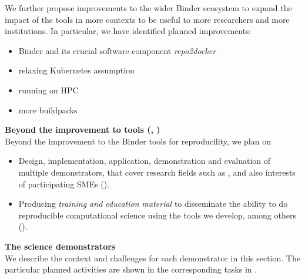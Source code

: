 We further propose improvements to the wider Binder ecosystem
to expand the impact of the tools in more contexts to be useful to more researchers
and more institutions.
In particular, we have identified planned improvements:

\begin{itemize}
  \item Binder and its crucial software component \emph{repo2docker}
  \item relaxing Kubernetes assumption
  \item running on HPC
  \item more buildpacks

\end{itemize}

\medskip\noindent\textbf{Beyond the improvement to \TheProject tools
  (, )}\\
Beyond the improvement to the Binder tools for reproducility, we plan on
\begin{itemize}
\item Design, implementation, application, demonstration and
  evaluation of multiple demonstrators, that cover research fields such as
  ,
  and also interests of participating SMEs ().
\item Producing \emph{training and education material} to disseminate
  the ability to do reproducible computational science using the tools
  we develop, among others ().
\end{itemize}

\medskip
\noindent
\textbf{The science
  demonstrators}\label{sec:science-demonstrators-in-concept}\\

We describe the context and challenges for each demonstrator in this
section. The particular planned activities are shown in the
corresponding tasks in .\\


